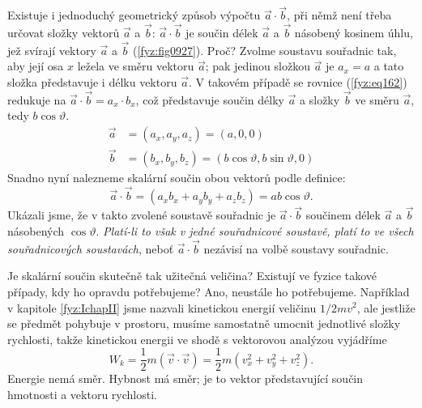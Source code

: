 
    Existuje i jednoduchý geometrický způsob výpočtu \(\vec{a}\cdot\vec{b}\), při němž není třeba
    určovat složky vektorů \(\vec{a}\) a \(\vec{b}\): \(\vec{a}\cdot\vec{b}\) je součin délek
    \(\vec{a}\) a \(\vec{b}\) násobený kosinem úhlu, jež svírají vektory \(\vec{a}\) a \(\vec{b}\)
    (\ref{fyz:fig0927}). Proč? Zvolme soustavu souřadnic tak, aby její osa \(x\) ležela ve směru
    vektoru \(\vec{a}\); pak jedinou složkou \(\vec{a}\) je \(a_x=a\) a tato složka představuje i
    délku vektoru \(\vec{a}\). V takovém případě se rovnice (\ref{fyz:eq162}) redukuje na
    \(\vec{a}\cdot\vec{b} = a_x\cdot b_x\), což představuje součin délky \(\vec{a}\) a složky
    \(\vec{b}\) ve směru \(\vec{a}\), tedy \(b\cos\vartheta\).
    \begin{equation}
      \begin{aligned}\label{fyz:eq753}
        \vec{a} &= (a_x, a_y, a_z) = (a, 0, 0)  \\
        \vec{b} &= (b_x, b_y, b_z) = (b\cos\vartheta, b\sin\vartheta, 0)
      \end{aligned}
    \end{equation}
    Snadno nyní nalezneme skalární součin obou vektorů podle definice: 
    \begin{equation*}
      \vec{a}\cdot\vec{b} = (a_xb_x + a_yb_y + a_zb_z) = ab\cos\vartheta.
    \end{equation*}
    Ukázali jsme, že v takto zvolené soustavě souřadnic je \(\vec{a}\cdot\vec{b}\) součinem délek 
    \(\vec{a}\) a \(\vec{b}\) násobených \(\cos\vartheta\). \emph{Platí-li to však v jedné 
    souřadnicové soustavě, platí to ve všech souřadnicových soustavách}, neboť 
    \(\vec{a}\cdot\vec{b}\) nezávisí na volbě soustavy souřadnic.
    
    

    Je skalární součin skutečně tak užitečná veličina? Existují ve fyzice takové případy, kdy ho 
    opravdu potřebujeme? Ano, neustále ho potřebujeme. Například v kapitole \ref{fyz:IchapII} jsme 
    nazvali kinetickou energií veličinu \(1/2 mv^2\), ale jestliže se předmět pohybuje v prostoru, 
    musíme samostatně umocnit jednotlivé složky rychlosti, takže kinetickou energii ve shodě s 
    vektorovou analýzou vyjádříme
    \begin{equation}\label{fyz:eq165}
      W_k = \frac{1}{2}m(\vec{v}\cdot\vec{v}) = \frac{1}{2}m(v_x^2 + v_y^2 + v_z^2).
    \end{equation}
    Energie nemá směr. Hybnost má směr; je to vektor představující součin hmotnosti a vektoru
    rychlosti.
    
